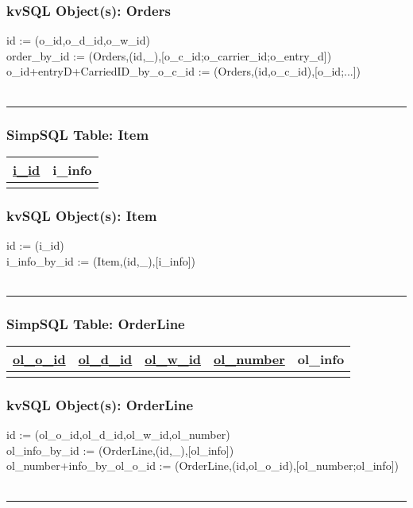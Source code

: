 \documentclass[12pt,letter]{article}
\begin{document}
\subsubsection*{kvSQL Object(s): Orders}  
id := (o\_id,o\_d\_id,o\_w\_id) \\
order\_by\_id := 
(Orders,(id,\_),[o\_c\_id;o\_carrier\_id;o\_entry\_d])  \\
o\_id+entryD+CarriedID\_by\_o\_c\_id := 
(Orders,(id,o\_c\_id),[o\_id;...])  \\
\\ 
\hrule


\subsubsection*{SimpSQL Table: Item}  
\begin{tabular}{ |c|c| }
 \hline
 \underline{i\_id} & i\_info\\
 \hline
 &   \\
 \hline
\end{tabular}

\subsubsection*{kvSQL Object(s): Item}  
id := (i\_id)\\
 i\_info\_by\_id := 
(Item,(id,\_),[i\_info]) \\
\\
\hrule


\subsubsection*{SimpSQL Table: OrderLine}  
\begin{tabular}{ |c|c|c|c|c| }
 \hline
 \underline{ol\_o\_id} & \underline{ol\_d\_id} & \underline{ol\_w\_id} &
 \underline{ol\_number} & ol\_info\\
 \hline
 &   &   & & \\
 \hline
\end{tabular}

\subsubsection*{kvSQL Object(s): OrderLine}  
id := (ol\_o\_id,ol\_d\_id,ol\_w\_id,ol\_number) \\
ol\_info\_by\_id :=
(OrderLine,(id,\_),[ol\_info]) \\
ol\_number+info\_by\_ol\_o\_id :=
(OrderLine,(id,ol\_o\_id),[ol\_number;ol\_info]) \\
\\ 
\hrule
\end{document}
